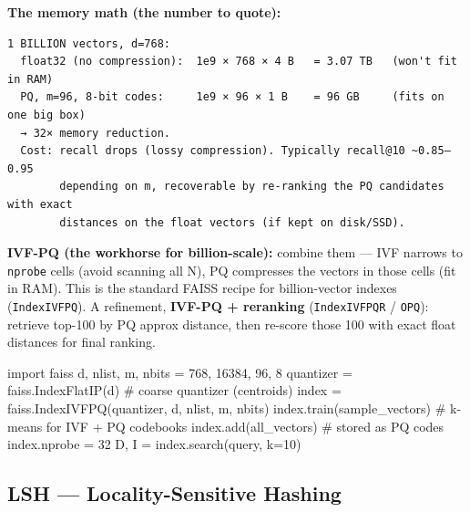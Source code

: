 \documentclass[11pt]{article}
\newenvironment{Shaded}{\begin{snugshade}}{\end{snugshade}}
\newcommand{\CommentTok}[1]{\textcolor[rgb]{0.48,0.49,0.49}{#1}}
\newcommand{\DecValTok}[1]{\textcolor[rgb]{0.96,0.45,0.00}{#1}}
\newcommand{\ImportTok}[1]{\textcolor[rgb]{0.15,0.68,0.38}{#1}}
\newcommand{\NormalTok}[1]{\textcolor[rgb]{0.81,0.81,0.76}{#1}}
\newcommand{\OperatorTok}[1]{\textcolor[rgb]{0.81,0.81,0.76}{#1}}
\begin{document}
\textbf{The memory math (the number to quote):}

\setcodelang{}

\begin{verbatim}
1 BILLION vectors, d=768:
  float32 (no compression):  1e9 × 768 × 4 B   = 3.07 TB   (won't fit in RAM)
  PQ, m=96, 8-bit codes:     1e9 × 96 × 1 B    = 96 GB     (fits on one big box)
  → 32× memory reduction.
  Cost: recall drops (lossy compression). Typically recall@10 ~0.85–0.95
        depending on m, recoverable by re-ranking the PQ candidates with exact
        distances on the float vectors (if kept on disk/SSD).
\end{verbatim}

\textbf{IVF-PQ (the workhorse for billion-scale):} combine them --- IVF narrows to \texttt{nprobe} cells (avoid scanning all N), PQ compresses the vectors in those cells (fit in RAM). This is the standard FAISS recipe for billion-vector indexes (\texttt{IndexIVFPQ}). A refinement, \textbf{IVF-PQ + reranking} (\texttt{IndexIVFPQR} / \texttt{OPQ}): retrieve top-100 by PQ approx distance, then re-score those 100 with exact float distances for final ranking.


\begin{Shaded}
\begin{Highlighting}[]
\ImportTok{import}\NormalTok{ faiss}
\NormalTok{d, nlist, m, nbits }\OperatorTok{=} \DecValTok{768}\NormalTok{, }\DecValTok{16384}\NormalTok{, }\DecValTok{96}\NormalTok{, }\DecValTok{8}
\NormalTok{quantizer }\OperatorTok{=}\NormalTok{ faiss.IndexFlatIP(d)                     }\CommentTok{\# coarse quantizer (centroids)}
\NormalTok{index }\OperatorTok{=}\NormalTok{ faiss.IndexIVFPQ(quantizer, d, nlist, m, nbits)}
\NormalTok{index.train(sample\_vectors)                          }\CommentTok{\# k{-}means for IVF + PQ codebooks}
\NormalTok{index.add(all\_vectors)                               }\CommentTok{\# stored as PQ codes}
\NormalTok{index.nprobe }\OperatorTok{=} \DecValTok{32}
\NormalTok{D, I }\OperatorTok{=}\NormalTok{ index.search(query, k}\OperatorTok{=}\DecValTok{10}\NormalTok{)}
\end{Highlighting}
\end{Shaded}

\subsection{LSH --- Locality-Sensitive Hashing}\label{lsh--locality-sensitive-hashing}
\end{document}
